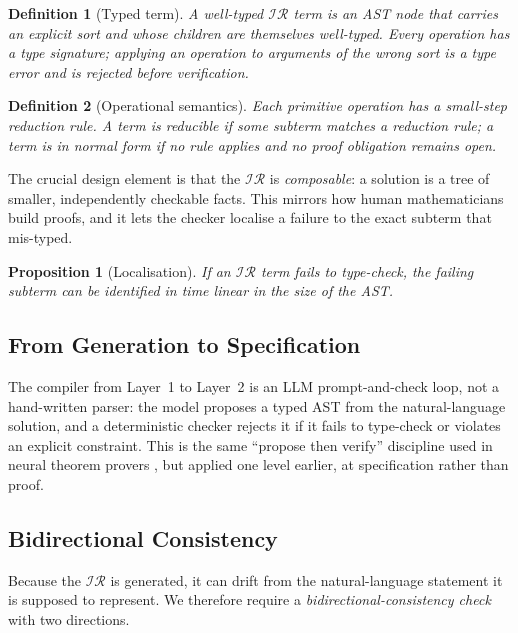 \documentclass[11pt]{article}
\newcommand{\IR}{\ensuremath{\mathcal{IR}}}
\newtheorem{definition}{Definition}
\newtheorem{proposition}{Proposition}
\begin{document}
\begin{definition}[Typed term]
A well-typed \IR{} term is an AST node that carries an explicit sort and whose
children are themselves well-typed. Every operation has a type signature;
applying an operation to arguments of the wrong sort is a \emph{type error} and
is rejected before verification.
\end{definition}

\begin{definition}[Operational semantics]
Each primitive operation has a small-step reduction rule. A term is
\emph{reducible} if some subterm matches a reduction rule; a term is in
\emph{normal form} if no rule applies and no proof obligation remains open.
\end{definition}

The crucial design element is that the \IR{} is \emph{composable}: a solution
is a tree of smaller, independently checkable facts. This mirrors how human
mathematicians build proofs, and it lets the checker localise a failure to the
exact subterm that mis-typed.

\begin{proposition}[Localisation]
If an \IR{} term fails to type-check, the failing subterm can be identified in
time linear in the size of the AST.
\end{proposition}

\subsection{From Generation to Specification}
\label{sec:compile}

The compiler from Layer~1 to Layer~2 is an LLM prompt-and-check loop, not a
hand-written parser: the model proposes a typed AST from the natural-language
solution, and a deterministic checker rejects it if it fails to type-check or
violates an explicit constraint. This is the same ``propose then verify''
discipline used in neural theorem provers
\citep{wang2023legoprover, yang2023leandojo}, but applied one level earlier, at
specification rather than proof.

\subsection{Bidirectional Consistency}
\label{sec:consistency}

Because the \IR{} is generated, it can drift from the natural-language
statement it is supposed to represent. We therefore require a
\emph{bidirectional-consistency check} with two directions.
\end{document}
